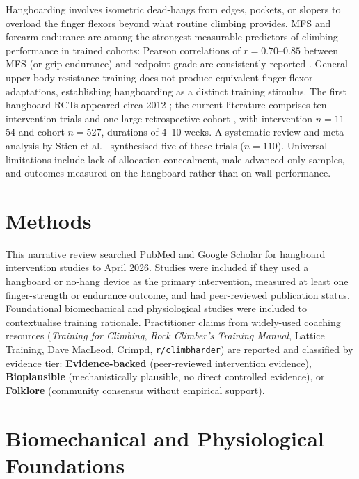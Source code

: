 \documentclass[12pt,a4paper]{article}
\begin{document}
Hangboarding involves isometric dead-hangs from edges, pockets, or slopers to overload the finger flexors beyond what routine climbing provides. MFS and forearm endurance are among the strongest measurable predictors of climbing performance in trained cohorts: Pearson correlations of $r = 0.70$--$0.85$ between MFS (or grip endurance) and redpoint grade are consistently reported \cite{watts2004,macleod2007,fryer2016}. General upper-body resistance training does not produce equivalent finger-flexor adaptations, establishing hangboarding as a distinct training stimulus. The first hangboard RCTs appeared circa 2012 \cite{lopezrivera2012,medernach2015}; the current literature comprises ten intervention trials and one large retrospective cohort \cite{lopezrivera2012,medernach2015,lopezrivera2019,levernier2019,mundry2021,devise2022,hermans2022,dindorf2024,langer2024,ruizlopez2025,gilmore2024}, with intervention $n = 11$--54 and cohort $n = 527$, durations of 4--10 weeks. A systematic review and meta-analysis by Stien et al.\ \cite{stien2023} synthesised five of these trials ($n = 110$). Universal limitations include lack of allocation concealment, male-advanced-only samples, and outcomes measured on the hangboard rather than on-wall performance.

\section{Methods}

This narrative review searched PubMed and Google Scholar for hangboard intervention studies to April 2026. Studies were included if they used a hangboard or no-hang device as the primary intervention, measured at least one finger-strength or endurance outcome, and had peer-reviewed publication status. Foundational biomechanical and physiological studies were included to contextualise training rationale. Practitioner claims from widely-used coaching resources (\textit{Training for Climbing}, \textit{Rock Climber's Training Manual}, Lattice Training, Dave MacLeod, Crimpd, \texttt{r/climbharder}) are reported and classified by evidence tier: \textbf{Evidence-backed} (peer-reviewed intervention evidence), \textbf{Bioplausible} (mechanistically plausible, no direct controlled evidence), or \textbf{Folklore} (community consensus without empirical support).

\section{Biomechanical and Physiological Foundations}
\end{document}

